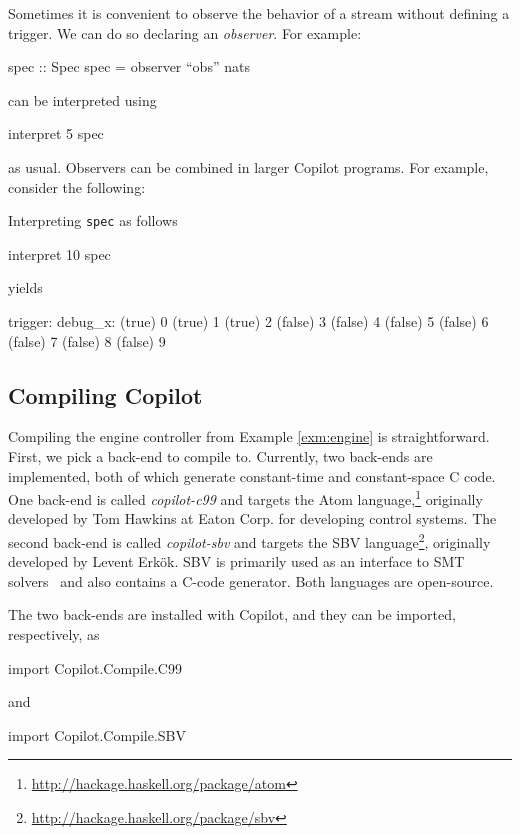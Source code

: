 \documentclass[]{article}
\theoremstyle{example}
\begin{document}
Sometimes it is convenient to observe the behavior of a stream without defining
a trigger.  We can do so declaring an \emph{observer}.  For example:
%
\begin{code}
spec :: Spec
spec = observer ``obs'' nats  
\end{code}
%
can be interpreted using
%
\begin{code}
interpret 5 spec  
\end{code}
%
as usual.  Observers can be combined in larger Copilot programs.  For example,
consider the following:
%
Interpreting {\tt spec} as follows
%
\begin{code}
interpret 10 spec
\end{code}
%
yields
%
\begin{code}
trigger:  debug_x: 
(true)    0        
(true)    1        
(true)    2        
(false)   3        
(false)   4        
(false)   5        
(false)   6        
(false)   7        
(false)   8        
(false)   9        
\end{code}

\subsection{Compiling Copilot}  \label{sec:compiling}

Compiling the engine controller from Example \ref{exm:engine} is
straightforward.  First, we pick a back-end to compile to.  Currently, two
back-ends are implemented, both of which generate constant-time and
constant-space C code.  One back-end is called \emph{copilot-c99} and targets
the Atom language,\footnote{\url{http://hackage.haskell.org/package/atom}}
originally developed by Tom Hawkins at Eaton Corp. for developing control
systems.  The second back-end is called \emph{copilot-sbv} and targets the SBV
language\footnote{\url{http://hackage.haskell.org/package/sbv}}, originally
developed by Levent Erk\"{o}k.  SBV is primarily used as an interface to SMT
solvers~\cite{BarST-SMT-10} and also contains a C-code generator.  Both
languages are open-source.

The two back-ends are installed with Copilot, and they can be imported,
respectively, as

\begin{code}
import Copilot.Compile.C99
\end{code}
\noindent
and
\begin{code}
import Copilot.Compile.SBV
\end{code}
\end{document}

